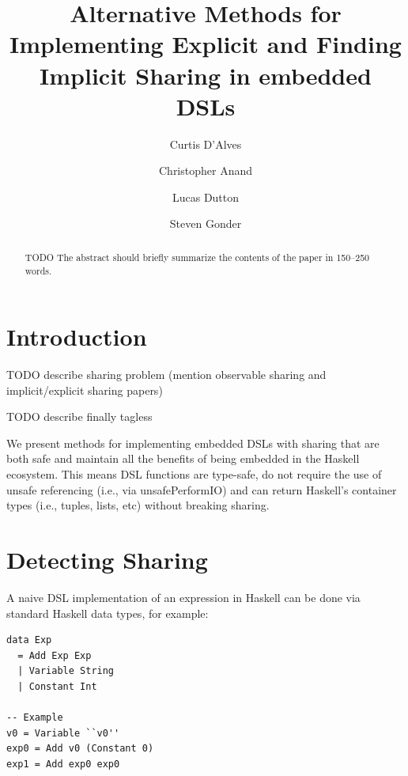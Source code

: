 \documentclass[runningheads]{llncs}
\begin{document}
\lstset{language=haskell}
%
\title{Alternative Methods for Implementing
    Explicit and Finding Implicit Sharing in embedded DSLs}
%
%
\author{Curtis D'Alves \and
Christopher Anand \and
Lucas Dutton \and
Steven Gonder
}
%
%
%
\maketitle              %
%
\begin{abstract}
TODO The abstract should briefly summarize the contents of the paper in
150--250 words.

\end{abstract}
%
%
%
\section{Introduction}

TODO describe sharing problem (mention observable sharing
\cite{gill:observablesharing} and implicit/explicit sharing
\cite{kiselyov:sharing} papers)

TODO describe finally tagless \cite{carette:finallytagless}

We present methods for implementing embedded DSLs with sharing that are both
safe and maintain all the benefits of being embedded in the Haskell ecosystem.
This means DSL functions are type-safe, do not require the use of unsafe
referencing (i.e., via unsafePerformIO) and can return Haskell's container
types (i.e., tuples, lists, etc) without breaking sharing.

\section{Detecting Sharing}

A naive DSL implementation of an expression in Haskell can be done via standard
Haskell data types, for example:

\begin{verbatim}
data Exp
  = Add Exp Exp
  | Variable String
  | Constant Int

-- Example
v0 = Variable ``v0''
exp0 = Add v0 (Constant 0)
exp1 = Add exp0 exp0
\end{verbatim}
\end{document}
